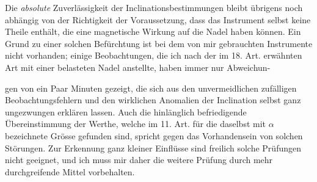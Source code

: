 Die \textit{absolute} Zuverlässigkeit der Inclinationsbestimmungen bleibt übrigens noch abhängig von der Richtigkeit der Voraussetzung, dass das Instrument selbst keine Theile enthält, die eine magnetische Wirkung auf die Nadel haben können. Ein Grund zu einer solchen Befürchtung ist bei dem von mir gebrauchten Instrumente nicht vorhanden; einige Beobachtungen, die ich nach der im 18. Art. erwähnten Art mit einer belasteten Nadel anstellte, haben immer nur Abweichun-
\par\clearpage
{}
\noindent gen von ein Paar Minuten gezeigt, die sich aus den unvermeidlichen zufälligen Beobachtungsfehlern und den wirklichen Anomalien der Inclination selbst ganz ungezwungen erklären lassen. Auch die hinlänglich befriedigende Übereinstimmung der Werthe, welche im 11. Art. für die daselbst mit $\alpha$ bezeichnete Grösse gefunden sind, spricht gegen das Vorhandensein von solchen Störungen. Zur Erkennung ganz kleiner Einflüsse sind freilich solche Prüfungen nicht geeignet, und ich muss mir daher die weitere Prüfung durch mehr durchgreifende Mittel vorbehalten.

